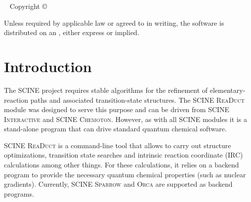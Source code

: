 \documentclass[]{tufte-book}
\title[SCINE ReaDuct manual]{User Manual \vskip 0.5em {\setlength{\parindent}{0pt} \Huge SCINE ReaDuct 1.0.0}}
\author[The SCINE ReaDuct Developers]{The SCINE ReaDuct Developers: \newline \noindent Christoph Brunken, Jan Unsleber, Alain Vaucher, and Markus Reiher}
\newcommand{\monthyear}{%
  \ifcase\month\or January\or February\or March\or April\or May\or June\or
  July\or August\or September\or October\or November\or
  December\fi\space\number\year
}
\begin{document}
\setlength{\parindent}{0pt}

\frontmatter


\maketitle


\newpage
\begin{fullwidth}
~\vfill
\thispagestyle{empty}
\setlength{\parindent}{0pt}
\setlength{\parskip}{\baselineskip}
Copyright \copyright\ \the\year\ \thanklessauthor


\par{}

\par Unless required by applicable law or agreed to in writing, the software 
is distributed on an , either express or implied. 

\end{fullwidth}

\tableofcontents




\mainmatter

\let\cleardoublepage\clearpage
\chapter{Introduction}

The SCINE project requires stable algorithms for the refinement of elementary-reaction paths and associated transition-state 
structures. The SCINE \textsc{ReaDuct} module was designed to serve this purpose and can be driven from SCINE \textsc{Interactive} 
and SCINE \textsc{Chemoton}. However, as with all SCINE modules it is a stand-alone program that can drive standard quantum 
chemical software.

SCINE \textsc{ReaDuct} is a command-line tool that allows to carry out structure optimizations, transition state searches
and intrinsic reaction coordinate (IRC) calculations among other things.
For these calculations, it relies on a backend program to provide the necessary quantum chemical properties (such
as nuclear gradients). Currently, SCINE \textsc{Sparrow}\cite{sparrow} and \textsc{Orca}\cite{orca} are supported as backend programs.
\end{document}
